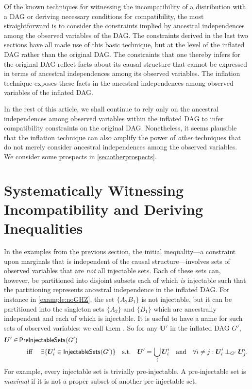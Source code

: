 \documentclass[aps,english,superscriptaddress,onecolumn,twoside,longbibliography,pra,floatfix,fleqn,nofootinbib]{revtex4-1}%
\newcommand*{\tblue}[1]{{\color{MidnightBlue}{\textbf{#1}}}}
\theoremstyle{definition}
\newcommand{\SmallNamedFunction}[3][]{\operatorname{\mathsf{#2}}_{#1}\parenths{#3}}
\newcommand{\aindep}{\perp} %
\DeclarePairedDelimiter{\parenths}{\lparen}{\rparen}
\begin{document}
Of the known techniques for witnessing the incompatibility of a distribution with a DAG or deriving necessary conditions for compatibility, the most straightforward is to consider the constraints implied by ancestral independences among the observed variables of the DAG. 
The constraints derived in the last two sections have all made use of this basic technique, but at the level of the inflated DAG rather than the original DAG.  The constraints that one thereby infers for the original DAG reflect facts about its causal structure that cannot be expressed in terms of ancestral independences among its observed variables.  The inflation technique exposes these facts in the ancestral independences among observed variables of the inflated DAG.

In the rest of this article, we shall continue to rely only on the ancestral independences among observed variables within the inflated DAG to infer compatibility constraints on the original DAG.   Nonetheless, it seems plausible that the inflation technique can also amplify the power of {\em other} techniques that do not merely consider ancestral independences among the observed variables.  We consider some prospects in \cref{sec:otherprospects}.

\section{Systematically Witnessing Incompatibility and Deriving Inequalities}
\label{sec:ineqs}

In the examples from the previous section, the initial inequality---a constraint upon marginals that is independent of the causal structure---involves sets of observed variables that are \emph{not} all injectable sets.  Each of these sets can, however, be partitioned into disjoint subsets each of which {\em is} injectable such that the partitioning represents ancestral independence in the inflated DAG. For instance in \cref{example:noGHZ}, the set $\{ A_2 B_1\}$ is not injectable, but it can be partitioned into the singleton sets $\{ A_2 \}$ and $\{ B_1\}$ which are ancestrally independent and each of which is injectable.  It is useful to have a name for such sets of observed variables: we call them \tblue{pre-injectable}. So for any $\bm{U}'$ in the inflated DAG $G'$,
\begin{align}\label{eq:defpreinj}
\begin{split}
\bm{U}'\in & \SmallNamedFunction{PreInjectableSets}{G'} \\
	& \quad\text{ iff }\quad  \exists \{ \bm{U}'_i \in \SmallNamedFunction{InjectableSets}{G'} \} \quad \text{s.t.}\quad \bm{U}'=\bigcup_i \bm{U}'_i  \quad\text{and} \quad  \forall i\ne j: \bm{U}'_i \aindep_{G'} \bm{U}'_j.
\end{split}
\end{align}
For example, every injectable set is trivially pre-injectable.  A pre-injectable set is \emph{maximal} if it is not a proper subset of another pre-injectable set.
\end{document}

